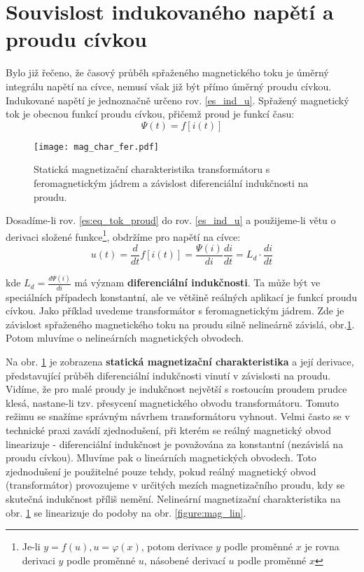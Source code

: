   \section{Souvislost indukovaného napětí a proudu cívkou}
    Bylo již řečeno, že časový průběh spřaženého magnetického toku je úměrný integrálu napětí na cívce, 
    nemusí však již být přímo úměrný proudu cívkou. Indukované napětí je jednoznačně určeno rov. 
    \ref{es_ind_u}. Spřažený magnetický tok je obecnou funkcí proudu cívkou, přičemž proud je
    funkcí času:
    \begin{equation}\label{es:eq_tok_proud}
      \Psi(t) = f[i(t)]
    \end{equation}       
    \begin{figure}[ht!]
      \centering
      \texttt{[image: mag\_char\_fer.pdf]}
      \caption{Statická magnetizační charakteristika transformátoru s feromagnetickým jádrem a závislost   
               diferenciální indukčnosti na proudu.}
      \label{es:fig_mag_char_trafa_fer}
    \end{figure}            
    Dosadíme-li rov. \ref{es:eq_tok_proud} do rov. \ref{es_ind_u} a použijeme-li větu o derivaci
    složené funkce\footnote{Je-li $y = f(u), u = \varphi(x)$, potom derivace $y$ podle proměnné $x$
    je rovna derivaci $y$ podle proměnné $u$, násobené derivací $u$ podle proměnné $x$}, obdržíme
    pro napětí na cívce:
    \begin{equation}\label{es_tok_deriv}
      u(t) = \frac{d}{dt} f[i(t)] = \frac{\Psi(i)}{di} \frac{di}{dt} = L_d \cdot \frac{di}{dt}
    \end{equation}

    kde $L_d=\frac{d\Psi(i)}{di}$ má význam \textbf{diferenciální indukčnosti}. Ta může být ve speciálních 
    případech konstantní, ale ve většině reálných aplikací je funkcí proudu cívkou. Jako příklad uvedeme 
    transformátor s feromagnetickým jádrem. Zde je závislost spřaženého magnetického toku na proudu silně 
    nelineárně závislá, obr.\ref{es:fig_mag_char_trafa_fer}. Potom mluvíme o nelineárních magnetických 
    obvodech.
    
    Na obr. \ref{es:fig_mag_char_trafa_fer} je zobrazena \textbf{statická magnetizační charakteristika} a 
    její derivace, představující průběh diferenciální indukčnosti vinutí v závislosti na proudu. Vidíme, že 
    pro malé proudy je indukčnost největší s rostoucím proudem prudce klesá, nastane-li tzv. přesycení 
    magnetického obvodu transformátoru. Tomuto režimu se snažíme správným návrhem transformátoru vyhnout. 
    Velmi často se v technické praxi zavádí zjednodušení, při kterém se reálný magnetický obvod linearizuje - 
    diferenciální indukčnost je považována za konstantní (nezávislá na proudu cívkou). Mluvíme pak o 
    lineárních magnetických obvodech. Toto zjednodušení je použitelné pouze tehdy, pokud reálný magnetický 
    obvod (transformátor) provozujeme v určitých mezích magnetizačního proudu, kdy se skutečná indukčnost
    příliš nemění. Nelineární magnetizační charakteristika na obr. \ref{es:fig_mag_char_trafa_fer} se 
    linearizuje do podoby na obr. \ref{figure:mag_lin}.

